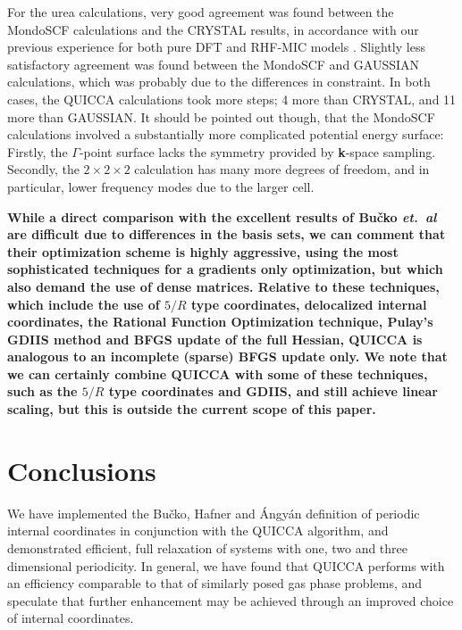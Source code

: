 \twolinestyle{\documentclass[prb,preprint]{revtex4}}
\begin{document}
For the urea calculations, very good agreement was found between the 
{\sc MondoSCF} calculations and the {\sc CRYSTAL} results, in accordance 
with our previous experience for both pure DFT \cite{CTymczak05a} and RHF-MIC models \cite{CTymczak05b}.  
Slightly less satisfactory agreement was found between the {\sc MondoSCF} and 
{\sc GAUSSIAN} calculations, which was probably due to the differences in 
constraint.  In both cases, the QUICCA calculations took more steps; 
4 more than {\sc CRYSTAL}, and 11 more than {\sc GAUSSIAN}.  It should
be pointed out though, that the {\sc MondoSCF} calculations involved 
a substantially more complicated potential energy surface:  Firstly, 
the $\Gamma$-point surface lacks the symmetry provided by {\bf k}-space
sampling.  Secondly, the $2\times2\times2$ calculation has many more 
degrees of freedom, and in particular, lower frequency modes due to the 
larger cell.  

{\bf  While a direct comparison with the excellent results of  Bu\v{c}ko 
{\em et.~al} \cite{TBucko05} are difficult due to differences in the basis sets, we can comment that 
their optimization scheme is highly aggressive, using the most sophisticated
techniques for a gradients only optimization, but which also demand the use of 
dense matrices. Relative to these techniques, which include the use of  $5/R$ type 
coordinates, delocalized internal coordinates, the Rational Function 
Optimization technique, Pulay's GDIIS method and BFGS update of 
the full Hessian, QUICCA is analogous to an incomplete (sparse) BFGS 
update only.  We note that we can certainly combine QUICCA with some of these
techniques, such as the   $5/R$ type coordinates and GDIIS,  and still achieve linear 
scaling, but this is outside the current scope of this paper.}

\section{Conclusions} \label{conclusion}

We have implemented the Bu\v{c}ko, Hafner and {\'A}ngy{\'a}n  \cite{TBucko05}
definition of periodic internal coordinates in conjunction with the QUICCA
algorithm, and demonstrated efficient, full relaxation of systems with 
one, two and three dimensional periodicity.  In general, we have found that
QUICCA performs with an efficiency comparable to that of similarly posed gas 
phase problems, and speculate that further enhancement  may be achieved through
an improved choice of internal coordinates.
\end{document}
